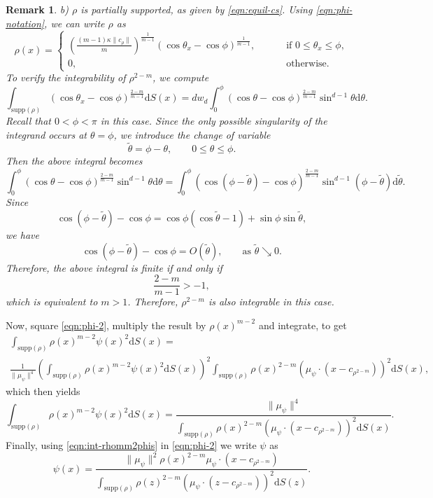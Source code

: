 \documentclass[11pt]{amsart}
\newtheorem{remark}{Remark}[section]
\def\d{\mathrm{d}}
\newcommand{\dx}{\mathrm{d}S (x)}
\newcommand{\dz}{\mathrm{d}S (z)}
\newcommand{\supp}{\mathrm{supp}(\rho)}
\newcommand{\dm}{d} %
\begin{document}
\begin{remark}
b) $\rho$ is partially supported, as given by \eqref{eqn:equil-cs}. Using \eqref{eqn:phi-notation}, we can write $\rho$ as 
\[
\rho(x)=\begin{cases}
\left(\frac{(m-1)\kappa\|c_\rho\|}{m}\right)^{\frac{1}{m-1}}\left(\cos\theta_x-\cos\phi\right)^{\frac{1}{m-1}},\qquad&\text{ if }0\leq\theta_x\leq \phi,\\[5pt]
0,\qquad&\text{ otherwise}.
\end{cases}
\]
To verify the integrability of $\rho^{2-m}$, we compute
\[
\int_{\supp}(\cos\theta_x-\cos\phi)^{\frac{2-m}{m-1}}\dx=\dm w_\dm
\int_0^\phi
(\cos\theta-\cos\phi)^{\frac{2-m}{m-1}}
\sin^{\dm-1}\theta\d\theta.
\]
Recall that $0<\phi<\pi$ in this case. Since the only possible singularity of the integrand occurs at $\theta=\phi$, we introduce the change of variable
\[
\tilde{\theta}=\phi-\theta,\qquad
0\le\theta\le\phi.
\]
Then the above integral becomes
\[
\int_0^\phi
(\cos\theta-\cos\phi)^{\frac{2-m}{m-1}}
\sin^{\dm-1}\theta\d\theta
=
\int_0^\phi
\left(\cos(\phi-\tilde{\theta})-\cos\phi\right)^{\frac{2-m}{m-1}}
\sin^{\dm-1}(\phi-\tilde{\theta})\d\tilde{\theta}.
\]
Since
\[
\cos(\phi-\tilde{\theta})-\cos\phi
=
\cos\phi(\cos\tilde{\theta}-1)+\sin\phi\sin\tilde{\theta},
\]
we have
\[
\cos(\phi-\tilde{\theta})-\cos\phi=O(\tilde{\theta}),
\qquad\text{as }\tilde{\theta}\searrow 0.
\]
Therefore, the above integral is finite if and only if
\[
\frac{2-m}{m-1}>-1,
\]
which is equivalent to $m>1$. Therefore, $\rho^{2-m}$ is also integrable in this case.
\end{remark}

Now, square \eqref{eqn:phi-2}, multiply the result by $\rho(x)^{m-2}$ and integrate, to get
\begin{multline}
\int_{\supp}\rho(x)^{m-2}\psi(x)^2\dx= \\ 
\frac{1}{\|\mu_{\psi}\|^4}\left(\int_{\supp}\rho(x)^{m-2}\psi(x)^2\dx\right)^2 \int_{\supp}\rho(x)^{2-m}\left(\mu_{\psi}\cdot (x-c_{\rho^{2-m}})\right)^2\dx,
\end{multline}
which then yields
\begin{equation}
\label{eqn:int-rhomm2phis}
\int_{\supp}\rho(x)^{m-2}\psi(x)^2\dx=\frac{\|\mu_{\psi}\|^4}{\int_{\supp}\rho(x)^{2-m}\left(\mu_{\psi}\cdot (x-c_{\rho^{2-m}})\right)^2\dx}.
\end{equation}
Finally, using \eqref{eqn:int-rhomm2phis} in \eqref{eqn:phi-2} we write $\psi$ as 
\begin{equation}
\label{eqn:phi-final}
\psi(x)=\frac{\|\mu_{\psi}\|^2\rho(x)^{2-m}\mu_{\psi}\cdot(x-c_{\rho^{2-m}})}{\int_{\supp}\rho(z)^{2-m}\left(\mu_{\psi}\cdot (z-c_{\rho^{2-m}})\right)^2\dz}.
\end{equation}
\end{document}
